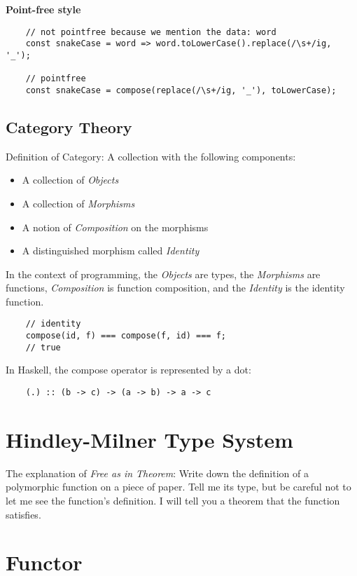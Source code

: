 \documentclass[UTF8]{ctexart}
\begin{document}
\textbf{Point-free style}
\begin{lstlisting}
    // not pointfree because we mention the data: word
    const snakeCase = word => word.toLowerCase().replace(/\s+/ig, '_');

    // pointfree
    const snakeCase = compose(replace(/\s+/ig, '_'), toLowerCase);
\end{lstlisting}

\subsection{Category Theory}
Definition of Category: A collection with the following components:
\begin{itemize}
    \item A collection of \textit{Objects}
    \item A collection of \textit{Morphisms}
    \item A notion of \textit{Composition} on the morphisms
    \item A distinguished morphism called \textit{Identity}
\end{itemize}

In the context of programming, the \textit{Objects} are types, the \textit{Morphisms} are functions, \textit{Composition} is function composition, and the \textit{Identity} is the identity function.

\begin{lstlisting}
    // identity
    compose(id, f) === compose(f, id) === f;
    // true
\end{lstlisting}

In Haskell, the compose operator is represented by a dot:
\begin{lstlisting}
    (.) :: (b -> c) -> (a -> b) -> a -> c
\end{lstlisting}

\section{Hindley-Milner Type System}

The explanation of \textit{Free as in Theorem}:
Write down the definition of a polymorphic function on a piece of paper. Tell me its type, but be careful not to let me see the function's definition. I will tell you a theorem that the function satisfies.

\section{Functor}
\end{document}
